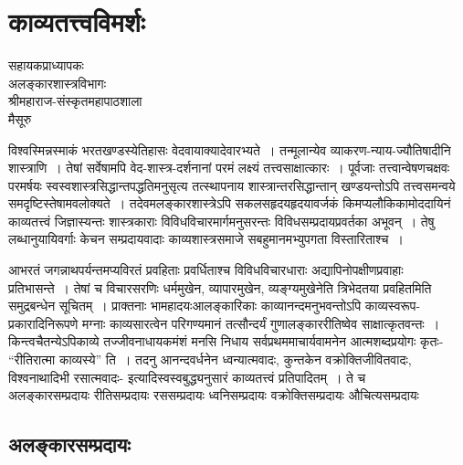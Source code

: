 {\fontsize{15}{17}\selectfont
\presetvalues
\chapter{काव्यतत्त्वविमर्शः}

\begin{center}
\smallskip

सहायकप्राध्यापकः\\
अलङ्कारशास्त्रविभागः\\
श्रीमहाराज-संस्कृतमहापाठशाला\\
मैसूरु
\addrule
\end{center}
विश्वस्मिन्नस्माकं भरतखण्डस्येतिहासः वेदवायाक्यादेवारभ्यते~। तन्मूलान्येव व्याकरण-न्याय-ज्यौतिषादीनि शास्त्राणि~। तेषां सर्वेषामपि वेद-शास्त्र-दर्शनानां परमं लक्ष्यं तत्त्वसाक्षात्कारः~। पूर्वजाः तत्त्वान्वेषणचक्षवः परमर्षयः स्वस्वशास्त्रसिद्धान्तपद्धतिमनुसृत्य तत्स्थापनाय शास्त्रान्तरसिद्धान्तान् खण्डयन्तोऽपि तत्त्वसमन्वये समदृष्टिस्तेषामवलोक्यते~।  तदेवमलङ्कारशास्त्रेऽपि सकलसहृदयहृदयावर्जकं किमप्यलौकिकामोददायिनं काव्यतत्त्वं जिज्ञास्यन्तः शास्त्रकाराः विविधविचारमार्गमनुसरन्तः विविधसम्प्रदायप्रवर्तका अभूवन्~। तेषु लब्धानुयायिवर्गाः केचन सम्प्रदायवादाः काव्यशास्त्रसमाजे सबहुमानमभ्युपगता विस्तारिताश्च~। 

आभरतं जगन्नाथपर्यन्तमप्यविरतं प्रवहिताः प्रवर्धिताश्च विविधविचारधाराः अद्यापि\break नोपक्षीणप्रवाहाः प्रतिभासन्ते~। तेषां च विचारसरणिः धर्ममुखेन, व्यापारमुखेन, व्यङ्ग्य\-मुखेनेति त्रिभेदतया प्रवहितमिति समुद्रबन्धेन सूचितम्~। प्राक्तनाः भामहादयः\break आलङ्कारिकाः काव्यानन्दमनुभवन्तोऽपि काव्यस्वरूप-प्रकारादिनिरूपणे मग्नाः काव्यसारत्वेन परिगण्यमानं तत्सौन्दर्यं गुणालङ्काररीतिष्वेव साक्षात्कृतवन्तः~। किन्त्वचैतन्येऽपि\break काव्ये तज्जीवनाधायकमंशं मनसि निधाय सर्वप्रथममाचार्यवामनेन आत्मशब्दप्रयोगः कृतः- “रीतिरात्मा काव्यस्ये” ति~।  तदनु आनन्दवर्धनेन ध्वन्यात्मवादः, कुन्तकेन वक्रोक्तिजीवितवादः, विश्वनाथादिभी रसात्मवादः- इत्यादिस्वस्वबुद्ध्यनुसारं काव्यतत्त्वं प्रतिपादितम्~। ते च \enginline{-}\\
  अलङ्कारसम्प्रदायः     रीतिसम्प्रदायः 	     रससम्प्रदायः   ध्वनिसम्प्रदायः\break	 {}  वक्रोक्तिसम्प्रदायः   औचित्यसम्प्रदायः 

\section*{ अलङ्कारसम्प्रदायः}

}
